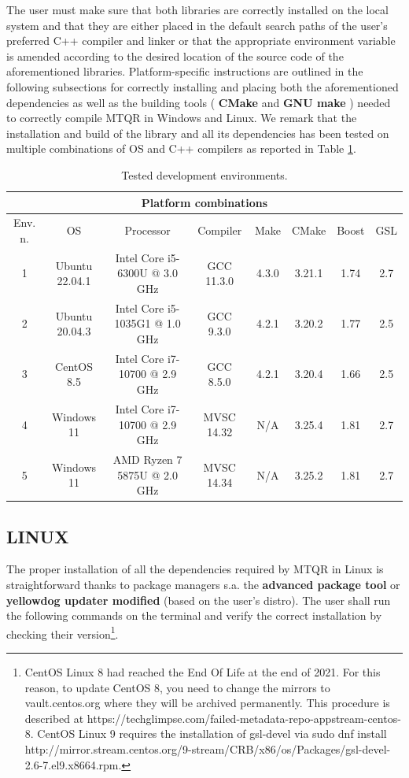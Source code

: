 \documentclass[a4paper, twosided]{book}
\begin{document}
\noindent
The user must make sure that both libraries are correctly installed on the local system and that they are either placed in the default search paths of the user's preferred C++ compiler and linker or that the appropriate environment variable is amended according to the desired location of the source code of the aforementioned libraries. Platform-specific instructions are outlined in the following subsections for correctly installing and placing both the aforementioned dependencies as well as the building tools (\color{poliDarkBlue} \textbf{CMake} \color{black} and \color{poliDarkBlue} \textbf{GNU make} \color{black}) needed to correctly compile MTQR in Windows and Linux. We remark that the installation and build of the library and all its dependencies has been tested on multiple combinations of OS and C++ compilers as reported in Table \ref{table2.1}.

\begin{table}[H]
\centering
\begin{tabular}{|c||c|c|c|c|c|c|c|}
\hline
\multicolumn{8}{|c|}{\textbf{Platform combinations}} \\
\hline
Env. n. & OS & Processor & Compiler & Make & CMake & Boost & GSL \\
\hline
1 & Ubuntu 22.04.1 & Intel Core i5-6300U @ 3.0 GHz & GCC 11.3.0 & 4.3.0 & 3.21.1 & 1.74 & 2.7 \\
2 & Ubuntu 20.04.3 & Intel Core i5-1035G1 @ 1.0 GHz & GCC 9.3.0 & 4.2.1 & 3.20.2 & 1.77 & 2.5 \\
3 & CentOS 8.5 & Intel Core i7-10700 @ 2.9 GHz  & GCC 8.5.0 & 4.2.1 & 3.20.4 & 1.66 & 2.5 \\
4 & Windows 11 & Intel Core i7-10700 @ 2.9 GHz  & MVSC 14.32 & N/A & 3.25.4 & 1.81 & 2.7 \\
5 & Windows 11 & AMD Ryzen 7 5875U @ 2.0 GHz & MVSC 14.34 & N/A & 3.25.2 & 1.81 & 2.7 \\
\hline
\end{tabular}
  \caption{Tested development environments.}
  \label{table2.1}
\end{table}

\subsection[Linux]{\changefont LINUX}\label{SubSec2.1.1}

The proper installation of all the dependencies required by MTQR in Linux is straightforward thanks to package managers s.a. the \color{poliDarkBlue} \textbf{advanced package tool} \color{black} or \color{poliDarkBlue} \textbf{yellowdog updater modified} \color{black} (based on the user's distro). The user shall run the following commands on the terminal and verify the correct installation by checking their version\footnote{CentOS Linux 8 had reached the End Of Life at the end of 2021. For this reason, to update CentOS 8, you need to change the mirrors to vault.centos.org where they will be archived permanently. This procedure is described at https://techglimpse.com/failed-metadata-repo-appstream-centos-8.
CentOS Linux 9 requires the installation of gsl-devel via 
sudo dnf install http://mirror.stream.centos.org/9-stream/CRB/x86/os/Packages/gsl-devel-2.6-7.el9.x86\textunderscore64.rpm.}.
\end{document}
